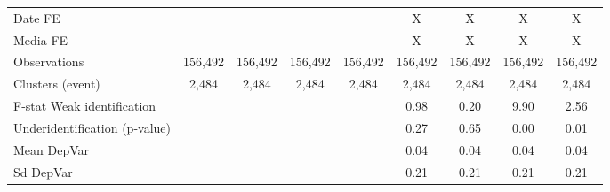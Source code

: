 {\begin{tabular}{l*{8}{c}}
\hline
Date FE             &                     &                     &                     &                     &           X         &           X         &           X         &           X         \\
Media FE            &                     &                     &                     &                     &           X         &           X         &           X         &           X         \\
Observations        &     156,492         &     156,492         &     156,492         &     156,492         &     156,492         &     156,492         &     156,492         &     156,492         \\
Clusters (event)    &       2,484         &       2,484         &       2,484         &       2,484         &       2,484         &       2,484         &       2,484         &       2,484         \\
F-stat Weak identification&                     &                     &                     &                     &        0.98         &        0.20         &        9.90         &        2.56         \\
Underidentification (p-value)&                     &                     &                     &                     &        0.27         &        0.65         &        0.00         &        0.01         \\
Mean DepVar         &                     &                     &                     &                     &        0.04         &        0.04         &        0.04         &        0.04         \\
Sd DepVar           &                     &                     &                     &                     &        0.21         &        0.21         &        0.21         &        0.21         \\
\hline\hline
\end{tabular}
}
